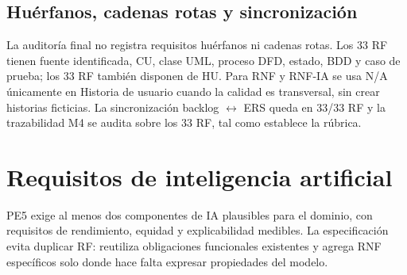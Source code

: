 \documentclass[12pt,a4paper]{article}
\begin{document}
\subsection{Huérfanos, cadenas rotas y sincronización}
La auditoría final no registra requisitos huérfanos ni cadenas rotas. Los 33 RF tienen fuente identificada, CU, clase UML, proceso DFD, estado, BDD y caso de prueba; los 33 RF también disponen de HU. Para RNF y RNF-IA se usa N/A únicamente en Historia de usuario cuando la calidad es transversal, sin crear historias ficticias. La sincronización backlog $\leftrightarrow$ ERS queda en 33/33 RF y la trazabilidad M4 se audita sobre los 33 RF, tal como establece la rúbrica.

\section{Requisitos de inteligencia artificial}
PE5 exige al menos dos componentes de IA plausibles para el dominio, con requisitos de rendimiento, equidad y explicabilidad medibles. La especificación evita duplicar RF: reutiliza obligaciones funcionales existentes y agrega RNF específicos solo donde hace falta expresar propiedades del modelo.
\end{document}
